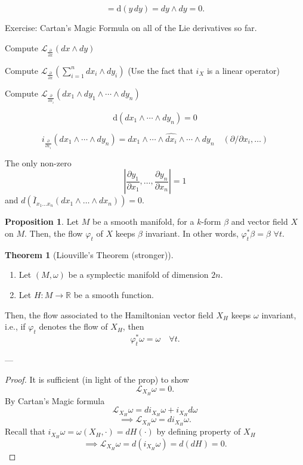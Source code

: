 \documentclass[11pt]{article}
\theoremstyle{definition}
\newtheorem{theorem}{Theorem}[section]
\newtheorem{proposition}{Proposition}[section]
\theoremstyle{remark}
\begin{document}
\[
= \mathrm{d}(y\,dy) = dy \wedge dy = 0.
\]

Exercise: Cartan's Magic Formula on all of the Lie derivatives so far.

Compute $\mathcal{L}_{\frac{\partial}{\partial x}} (dx \wedge dy)$

Compute $\mathcal{L}_{\frac{\partial}{\partial x}} \left( \sum_{i=1}^n dx_i \wedge dy_i \right)$ (Use the fact that $i_X$ is a linear operator)

Compute $\mathcal{L}_{\frac{\partial}{\partial x_i}} (dx_1 \wedge dy_1 \wedge \cdots \wedge dy_n)$

\[
\mathrm{d}(dx_1 \wedge \cdots \wedge dy_n) = 0
\]

\[
i_{\frac{\partial}{\partial x_i}} (dx_1 \wedge \cdots \wedge dy_n) = dx_1 \wedge \cdots \wedge \widehat{dx_i} \wedge \cdots \wedge dy_n \quad (\partial/\partial x_i, \ldots)
\]

The only non-zero
\[
\left| \frac{\partial y_1}{\partial x_1}, \ldots, \frac{\partial y_n}{\partial x_n} \right| = 1
\]
and $d\left( \overline{I}_{x_1 \ldots x_n} (dx_1 \wedge \ldots \wedge dx_n) \right) = 0$.

\begin{proposition}\label{prop:invariance_kform}
Let $M$ be a smooth manifold, for a $k$-form $\beta$ and vector field $X$ on $M$. Then, the flow $\varphi_t$ of $X$ keeps $\beta$ invariant. In other words, $\varphi_t^* \beta = \beta$ $\forall t$.
\end{proposition}

\begin{theorem}[Liouville's Theorem (stronger)]\label{thm:liouville_stronger}
\begin{enumerate}
    \item Let $(M, \omega)$ be a symplectic manifold of dimension $2n$.
    \item Let $H: M \to \mathbb{R}$ be a smooth function.
\end{enumerate}
Then, the flow associated to the Hamiltonian vector field $X_H$ keeps $\omega$ invariant, i.e., if $\varphi_t$ denotes the flow of $X_H$, then
\[
\varphi_t^* \omega = \omega \quad \forall t.
\]
\end{theorem}

---

\begin{proof}
It is sufficient (in light of the prop) to show
\[
\mathcal{L}_{X_H} \omega = 0.
\]
By Cartan's Magic formula
\[
\mathcal{L}_{X_H} \omega = d i_{X_H} \omega + i_{X_H} d \omega
\]
\[
\implies \mathcal{L}_{X_H} \omega = d i_{X_H} \omega.
\]
Recall that $i_{X_H} \omega = \omega(X_H, \cdot) = dH(\cdot)$ by defining property of $X_H$
\[
\implies \mathcal{L}_{X_H} \omega = d(i_{X_H} \omega) = d(dH) = 0.
\]
\end{proof}
\end{document}
